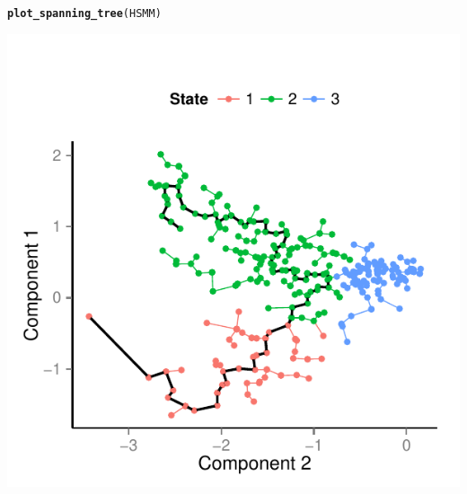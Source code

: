 \documentclass[10pt,oneside]{article}\usepackage[]{graphicx}\usepackage[]{color}
\makeatletter
\def\maxwidth{ %
  \ifdim\Gin@nat@width>\linewidth
    \linewidth
  \else
    \Gin@nat@width
  \fi
}
\newcommand{\hlstd}[1]{\textcolor[rgb]{0.345,0.345,0.345}{#1}}%
\newcommand{\hlkwd}[1]{\textcolor[rgb]{0.737,0.353,0.396}{\textbf{#1}}}%
\newenvironment{kframe}{%
 \def\at@end@of@kframe{}%
 \ifinner\ifhmode%
  \def\at@end@of@kframe{\end{minipage}}%
  \begin{minipage}{\columnwidth}%
 \fi\fi%
 \def\FrameCommand##1{\hskip\@totalleftmargin \hskip-\fboxsep
 \colorbox{shadecolor}{##1}\hskip-\fboxsep
     \hskip-\linewidth \hskip-\@totalleftmargin \hskip\columnwidth}%
 \MakeFramed {\advance\hsize-\width
   \@totalleftmargin\z@ \linewidth\hsize
   \@setminipage}}%
 {\par\unskip\endMakeFramed%
 \at@end@of@kframe}
\newenvironment{knitrout}{}{} %
\makeatother
\begin{document}
\begin{knitrout}
\color{fgcolor}\begin{kframe}
\begin{alltt}
\hlkwd{plot_spanning_tree}\hlstd{(HSMM)}
\end{alltt}
\end{kframe}

{\centering \includegraphics[width=\maxwidth]{figure/plot_ordering_mst} 

}



\end{knitrout}
\end{document}
